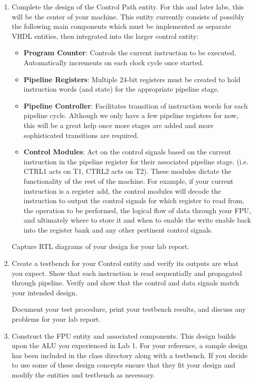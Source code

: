 \documentclass{article}
\begin{document}
\begin{enumerate}
  \item Complete the design of the Control Path entity. For this and later labs, this will be the center of your machine. This entity currently consists of possibly the following main components which must be implemented as separate VHDL entities, then integrated into the larger control entity:
  \begin{itemize}
    \item \textbf{Program Counter}: Controls the current instruction to be executed. Automatically increments on each clock cycle once started.
    \item \textbf{Pipeline Registers}: Multiple 24-bit registers must be created to hold instruction words (and state) for the appropriate pipeline stage.
    \item \textbf{Pipeline Controller}: Facilitates transition of instruction words for each pipeline cycle. Although we only have a few pipeline registers for now, this will be a great help once more stages are added and more sophisticated transitions are required.
    \item \textbf{Control Modules}: Act on the control signals based on the current instruction in the pipeline register for their associated pipeline stage. (i.e. CTRL1 acts on T1, CTRL2 acts on T2). These modules dictate the functionality of the rest of the machine. For example, if your current instruction is a register add, the control modules will decode the instruction to output the control signals for which register to read from, the operation to be performed, the logical flow of data through your FPU, and ultimately where to store it and when to enable the write enable back into the register bank and any other pertinent control signals.
  \end{itemize}
  Capture RTL diagrams of your design for your lab report.

  \item Create a testbench for your Control entity and verify its outputs are what you expect. Show that each instruction is read sequentially and propagated through pipeline. Verify and show that the control and data signals match your intended design.
  
  Document your test procedure, print your testbench results, and discuss any problems for your lab report.

  \item Construct the FPU entity and associated components. This design builds upon the ALU you experienced in Lab 1. For your reference, a sample design has been included in the class directory along with a testbench. If you decide to use some of these design concepts ensure that they fit your design and modify the entities and testbench as necessary.
  

\end{enumerate}
\end{document}
